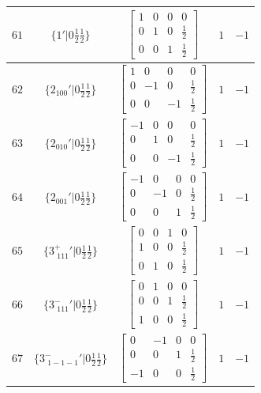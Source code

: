 \documentclass[fleqn,8pt]{jsarticle}
\begin{document}
\begin{longtable}{ccccc}
$ 61 $ & $ \{1{}'|0 \frac{1}{2} \frac{1}{2}\} $ & $ \begin{bmatrix} 1 & 0 & 0 & 0 \\ 0 & 1 & 0 & \frac{1}{2} \\ 0 & 0 & 1 & \frac{1}{2} \end{bmatrix} $ & $ 1 $ & $ -1 $ \\ \hline
$ 62 $ & $ \{2{}_{100}{}'|0 \frac{1}{2} \frac{1}{2}\} $ & $ \begin{bmatrix} 1 & 0 & 0 & 0 \\ 0 & -1 & 0 & \frac{1}{2} \\ 0 & 0 & -1 & \frac{1}{2} \end{bmatrix} $ & $ 1 $ & $ -1 $ \\ \hline
$ 63 $ & $ \{2{}_{010}{}'|0 \frac{1}{2} \frac{1}{2}\} $ & $ \begin{bmatrix} -1 & 0 & 0 & 0 \\ 0 & 1 & 0 & \frac{1}{2} \\ 0 & 0 & -1 & \frac{1}{2} \end{bmatrix} $ & $ 1 $ & $ -1 $ \\ \hline
$ 64 $ & $ \{2{}_{001}{}'|0 \frac{1}{2} \frac{1}{2}\} $ & $ \begin{bmatrix} -1 & 0 & 0 & 0 \\ 0 & -1 & 0 & \frac{1}{2} \\ 0 & 0 & 1 & \frac{1}{2} \end{bmatrix} $ & $ 1 $ & $ -1 $ \\ \hline
$ 65 $ & $ \{3^{+}_{\,\,111}{}'|0 \frac{1}{2} \frac{1}{2}\} $ & $ \begin{bmatrix} 0 & 0 & 1 & 0 \\ 1 & 0 & 0 & \frac{1}{2} \\ 0 & 1 & 0 & \frac{1}{2} \end{bmatrix} $ & $ 1 $ & $ -1 $ \\ \hline
$ 66 $ & $ \{3^{-}_{\,\,111}{}'|0 \frac{1}{2} \frac{1}{2}\} $ & $ \begin{bmatrix} 0 & 1 & 0 & 0 \\ 0 & 0 & 1 & \frac{1}{2} \\ 1 & 0 & 0 & \frac{1}{2} \end{bmatrix} $ & $ 1 $ & $ -1 $ \\ \hline
$ 67 $ & $ \{3^{-}_{\,\,1-1-1}{}'|0 \frac{1}{2} \frac{1}{2}\} $ & $ \begin{bmatrix} 0 & -1 & 0 & 0 \\ 0 & 0 & 1 & \frac{1}{2} \\ -1 & 0 & 0 & \frac{1}{2} \end{bmatrix} $ & $ 1 $ & $ -1 $ \\ \hline

\end{longtable}
\end{document}
